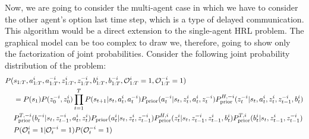 \label{sec:chap4-multi-soft-HRL-communication}
Now, we are going to consider the multi-agent case in which we have to consider the other agent's option last time step, which is a type of delayed communication. This algorithm would be a direct extension to the single-agent HRL problem. The graphical model can be too complex to draw we, therefore, going to show only the factorization of joint probabilities. Consider the following joint probability distribution of the problem:
\begin{equation}
\begin{aligned}
    P(&s_{1:T}, a^i_{1:T}, a^{-i}_{1:T}, z^i_{1:T}, z^{-i}_{1:T}, b^i_{1:T}, b^{-i}_{1:T}, \mathcal{O}^i_{1:T} = 1, \mathcal{O}^{-i}_{1:T} = 1) \\
    &= P(s_1)P(z^{-i}_0, z^i_0)\prod^T_{t=1} P(s_{t+1} | s_t, a_t^i, a_t^{-i})P_{\text{prior}}(a^{-i}_t | s_t, z^i_t, a^i_t, z^{-i}_t) P^{H,-i}_{\text{prior}}(z^{-i}_t | s_t, a^i_t, z^i_t, z^{-i}_{t-1}, b^i_t) \\
    &P^{T,-i}_{\text{prior}}(b^{-i}_t | s_t,  z^{-i}_{t-1}, a^i_t, z^i_t) P_{\text{prior}}(a^i_t | s_t, z^i_t, z^{-i}_{t-1}) P^{H,i}_{\text{prior}}(z^i_t | s_t, z^{-i}_{t-1}, z^i_{t-1}, b^i_t) P^{T,i}_{\text{prior}}(b^i_t | s_t, z^i_{t-1}, z^{-i}_{t-1})\\
    &P(\mathcal{O}^i_t = 1 | \mathcal{O}^{-i}_t = 1)P(\mathcal{O}^{-i}_t = 1)
\end{aligned}
\end{equation}
